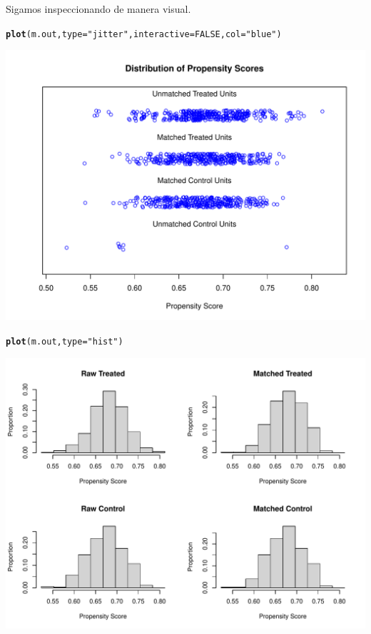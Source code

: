 \documentclass[onesided]{article}\usepackage[]{graphicx}\usepackage[]{color}
\makeatletter
\def\maxwidth{ %
  \ifdim\Gin@nat@width>\linewidth
    \linewidth
  \else
    \Gin@nat@width
  \fi
}
\newcommand{\hlnum}[1]{\textcolor[rgb]{0.686,0.059,0.569}{#1}}%
\newcommand{\hlstr}[1]{\textcolor[rgb]{0.192,0.494,0.8}{#1}}%
\newcommand{\hlstd}[1]{\textcolor[rgb]{0.345,0.345,0.345}{#1}}%
\newcommand{\hlkwc}[1]{\textcolor[rgb]{0.333,0.667,0.333}{#1}}%
\newcommand{\hlkwd}[1]{\textcolor[rgb]{0.737,0.353,0.396}{\textbf{#1}}}%
\newenvironment{kframe}{%
 \def\at@end@of@kframe{}%
 \ifinner\ifhmode%
  \def\at@end@of@kframe{\end{minipage}}%
  \begin{minipage}{\columnwidth}%
 \fi\fi%
 \def\FrameCommand##1{\hskip\@totalleftmargin \hskip-\fboxsep
 \colorbox{shadecolor}{##1}\hskip-\fboxsep
     \hskip-\linewidth \hskip-\@totalleftmargin \hskip\columnwidth}%
 \MakeFramed {\advance\hsize-\width
   \@totalleftmargin\z@ \linewidth\hsize
   \@setminipage}}%
 {\par\unskip\endMakeFramed%
 \at@end@of@kframe}
\newenvironment{knitrout}{}{} %
\makeatother
\begin{document}
Sigamos inspeccionando de manera visual.

\begin{knitrout}
\color{fgcolor}\begin{kframe}
\begin{alltt}
\hlkwd{plot}\hlstd{(m.out,} \hlkwc{type} \hlstd{=} \hlstr{"jitter"}\hlstd{,} \hlkwc{interactive} \hlstd{=} \hlnum{FALSE}\hlstd{,} \hlkwc{col} \hlstd{=} \hlstr{"blue"}\hlstd{)}
\end{alltt}
\end{kframe}

{\centering \includegraphics[width=\maxwidth]{figure/sim:6-1} 

}


\begin{kframe}\begin{alltt}
\hlkwd{plot}\hlstd{(m.out,} \hlkwc{type} \hlstd{=} \hlstr{"hist"}\hlstd{)}
\end{alltt}
\end{kframe}

{\centering \includegraphics[width=\maxwidth]{figure/sim:6-2} 

}
\end{knitrout}
\end{document}
